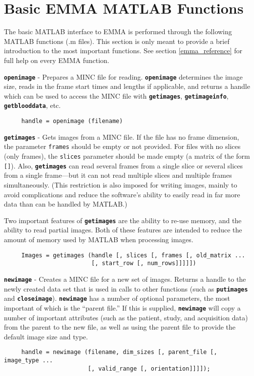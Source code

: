 \documentclass[11pt]{article}
\def\code#1{{\tt \bf #1}}
\begin{document}
\newpage
\section{Basic EMMA MATLAB Functions}

The basic MATLAB interface to EMMA is performed through the following
MATLAB functions (.m files).  This section is only meant to provide a
brief introduction to the most important functions.  See section
\ref{emma_reference} for full help on every EMMA function.

\begin{description}

\item \code{openimage} - Prepares a MINC file for reading.
\code{openimage} determines the image size, reads in the frame start
times and lengths if applicable, and returns a handle which can be
used to access the MINC file with \code{getimages},
\code{getimageinfo}, \code{getblooddata}, etc.
\begin{verbatim}
     handle = openimage (filename)
\end{verbatim}

\item \code{getimages} - Gets images from a MINC file.  If the file
has no frame dimension, the parameter \verb|frames| should be empty
or not provided.  For files with no slices (only frames), the
\verb|slices| parameter should be made empty (a matrix of the form
\verb|[]|).  Also, \code{getimages} can read several frames from a
single slice or several slices from a single frame---but it can not
read multiple slices and multiple frames simultaneously.  (This
restriction is also imposed for writing images, mainly to avoid
complications and reduce the software's ability to easily read in far
more data than can be handled by MATLAB.)

Two important features of \code{getimages} are the ability to re-use
memory, and the ability to read partial images.  Both of these
features are intended to reduce the amount of memory used by MATLAB
when processing images.
\begin{verbatim}
     Images = getimages (handle [, slices [, frames [, old_matrix ...
                         [, start_row [, num_rows]]]]])
\end{verbatim}

\item \code{newimage} - Creates a MINC file for a new set of images.
Returns a handle to the newly created data set that is used in calls
to other functions (such as \code{putimages} and \code{closeimage}).
\code{newimage} has a number of optional parameters, the most
important of which is the ``parent file.''  If this is supplied,
\code{newimage} will copy a number of important attributes (such as
the patient, study, and acquisition data) from the parent to the new
file, as well as using the parent file to provide the default image
size and type.
\begin{verbatim}
     handle = newimage (filename, dim_sizes [, parent_file [, image_type ...
                        [, valid_range [, orientation]]]]);
\end{verbatim}


\end{description}
\end{document}
